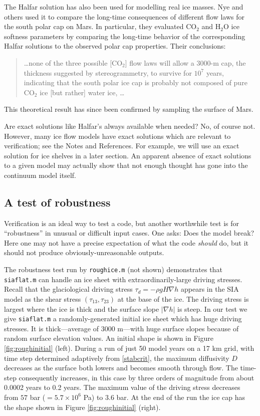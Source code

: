 \documentclass[letterpaper,final,12pt,reqno]{amsart}
\newcommand{\grad}{\nabla}
\begin{document}
The Halfar solution has also been used for modelling real ice masses.  Nye and others \cite{NyeIcarus2000} used it to compare the long-time consequences of different flow laws for the south polar cap on Mars.  In particular, they evaluated $\text{CO}_2$ and $\text{H}_2\text{O}$ ice softness parameters by comparing the long-time behavior of the corresponding Halfar solutions to the observed polar cap properties.  Their conclusions:
  \begin{quote}
  \dots none of the three possible [$\text{CO}_2$] flow laws will allow a 3000-m cap, the thickness suggested by stereogrammetry, to survive for $10^7$ years, indicating that the south polar ice cap is probably not composed of pure $\text{CO}_2$ ice [but rather] water ice, \dots
  \end{quote}
This theoretical result has since been confirmed by sampling the surface of Mars.

Are exact solutions like Halfar's always available when needed?  No, of course not.  However, many ice flow models have exact solutions which are relevant to verification; see the Notes and References.  For example, we will use an exact solution for ice shelves in a later section.  An apparent absence of exact solutions to a given model may actually show that not enough thought has gone into the continuum model itself.

\subsection*{A test of robustness}  Verification is an ideal way to test a code, but another worthwhile test is for ``robustness'' in unusual or difficult input cases.  One asks: Does the model break?  Here one may not have a precise expectation of what the code \emph{should} do, but it should not produce obviously-unreasonable outputs.

The robustness test run by \texttt{roughice.m} (not shown) demonstrates that \texttt{siaflat.m} can handle an ice sheet with extraordinarily-large driving stresses.  Recall that the glaciological driving stress $\tau_d = - \rho g H \grad h$ appears in the SIA model as the shear stress $(\tau_{13},\tau_{23})$ at the base of the ice.  The driving stress is largest where the ice is thick and the surface slope $|\nabla h|$ is steep.  In our test we give \texttt{siaflat.m} a randomly-generated initial ice sheet which has huge driving stresses.  It is thick---average of 3000 m---with huge surface slopes because of random surface elevation values.  An initial shape is shown in Figure \ref{fig:roughinitial} (left).  During a run of just 50 model years on a 17 km grid, with time step determined adaptively from \eqref{stabcrit}, the maximum diffusivity $D$ decreases as the surface both lowers and becomes smooth through flow.  The time-step consequently increases, in this case by three orders of magnitude from about 0.0002 years to 0.2 years.  The maximum value of the driving stress decreases from $57$ bar ($= 5.7\times 10^6$ Pa) to $3.6$ bar.  At the end of the run the ice cap has the shape shown in Figure \ref{fig:roughinitial} (right).
\end{document}
